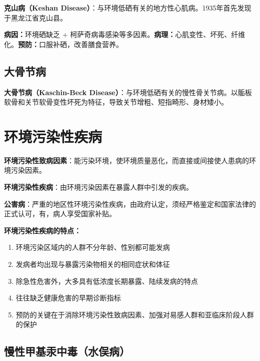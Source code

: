 \begin{defbox}
\textbf{克山病（Keshan Disease）}：与环境低硒有关的地方性心肌病。1935年首先发现于黑龙江省克山县。
\end{defbox}

\textbf{病因：}环境硒缺乏 + 柯萨奇病毒感染等多因素。\textbf{病理：}心肌变性、坏死、纤维化。\textbf{预防：}口服补硒，改善膳食营养。

\subsection{大骨节病}

\textbf{大骨节病（Kaschin-Beck Disease）}：与环境低硒有关的慢性骨关节病。以骺板软骨和关节软骨变性坏死为特征，导致关节增粗、短指畸形、身材矮小。

\section{环境污染性疾病}

\begin{defbox}
\textbf{环境污染性致病因素}：能污染环境，使环境质量恶化，而直接或间接使人患病的环境污染因素。

\textbf{环境污染性疾病}：由环境污染因素在暴露人群中引发的疾病。

\textbf{公害病}：严重的地区性环境污染性疾病，由政府认定，须经严格鉴定和国家法律的正式认可，有，病人享受国家补贴。
\end{defbox}

\textbf{环境污染性疾病的特点：}
\begin{enumerate}[leftmargin=*]
    \item 环境污染区域内的人群不分年龄、性别都可能发病
    \item 发病者均出现与暴露污染物相关的相同症状和体征
    \item 除急性危害外，大多具有低浓度长期暴露、陆续发病的特点
    \item 往往缺乏健康危害的早期诊断指标
    \item 预防的关键在于消除环境污染性致病因素、加强对易感人群和亚临床阶段人群的保护
\end{enumerate}

\subsection{慢性甲基汞中毒（水俣病）}

